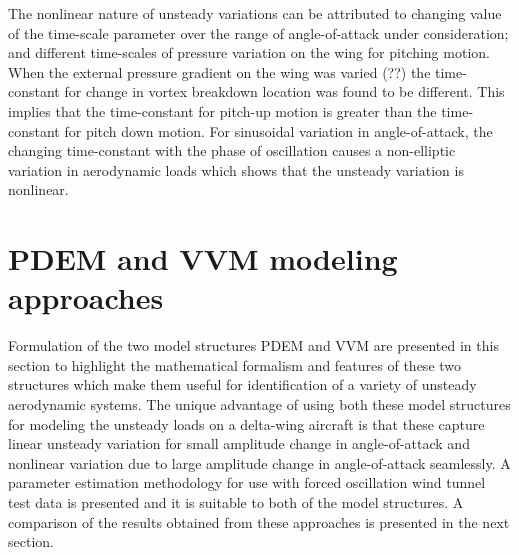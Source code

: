 \documentclass{AIAA}
\begin{document}
The nonlinear nature of unsteady variations can be attributed to changing value of the time-scale parameter over the range of angle-of-attack under consideration; and different time-scales of pressure variation on the wing for pitching motion. When the external pressure gradient on the wing was varied (??) the time-constant for change in vortex breakdown location was found to be different. This implies that the time-constant for pitch-up motion is greater than the time-constant for pitch down motion. For sinusoidal variation in angle-of-attack, the changing time-constant with the phase of oscillation causes a non-elliptic variation in aerodynamic loads which shows that the unsteady variation is nonlinear.


\section{PDEM and VVM modeling approaches}


Formulation of the two model structures PDEM and VVM are presented in this section to highlight the mathematical formalism and features of these two structures which make them useful for identification of a variety of unsteady aerodynamic systems. The unique advantage of using both these model structures for modeling the unsteady loads on a delta-wing aircraft is that these capture linear unsteady variation for small amplitude change in angle-of-attack and nonlinear variation due to large amplitude change in angle-of-attack seamlessly. A parameter estimation methodology for use with forced oscillation wind tunnel test data is presented and it is suitable to both of the model structures.  A comparison of the results obtained from these approaches is presented in the next section.
\end{document}
